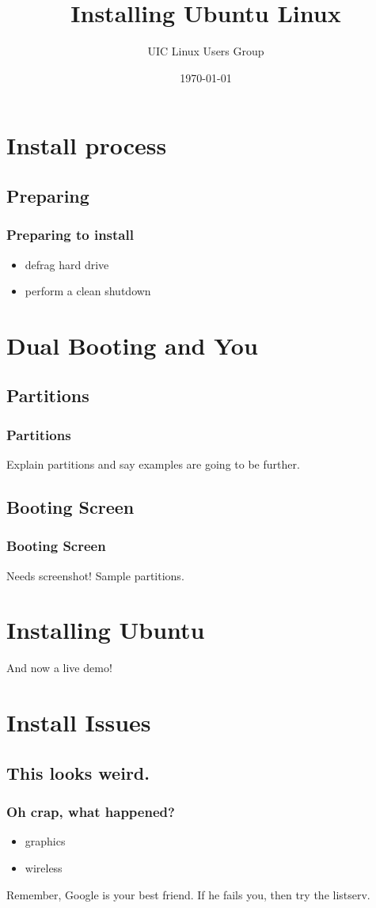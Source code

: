 \documentclass[hyperref={pdfpagelabels=false}]{beamer}
\title{Installing Ubuntu Linux}
\author{UIC Linux Users Group}
\date{\today}
\begin{document}
\frame{\titlepage}
\section[outline]{}
\frame{\tableofcontents}
\section{Install process}
\subsection{Preparing}
\frame
{
    \frametitle{Preparing to install}
    \begin{itemize}
    \item{defrag hard drive}
    \item{perform a clean shutdown}
    \end{itemize}
}
\section{Dual Booting and You}
\subsection{Partitions}
\frame
{
	\frametitle{Partitions}
	Explain partitions and say examples are going to be further.
}
\subsection{Booting Screen}
\frame
{
	\frametitle{Booting Screen}
	Needs screenshot! Sample partitions.
}
\section{Installing Ubuntu}
\frame
{
	And now a live demo!
}
\section{Install Issues}
\subsection{This looks weird.}
\frame
{
	\frametitle{Oh crap, what happened?}
	\begin{itemize}
	\item{graphics}
	\item{wireless}
	\end{itemize}
	Remember, Google is your best friend. If he fails you, then try the listserv.
}
\end{document}
